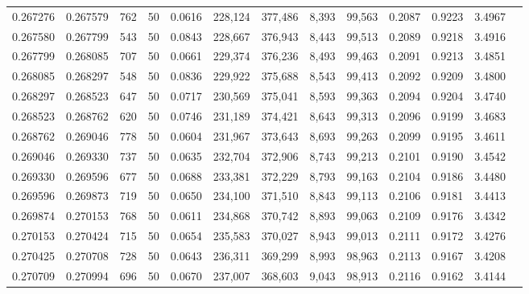 \begin{tabular}{rrrrrrrrrrrrr}
0.267276 & 0.267579 &   762 &  50 &                                     0.0616 & 228,124 & 377,486 &   8,393 &  99,563 & 0.2087 & 0.9223 & 3.4967 \\
0.267580 & 0.267799 &   543 &  50 &                                     0.0843 & 228,667 & 376,943 &   8,443 &  99,513 & 0.2089 & 0.9218 & 3.4916 \\
0.267799 & 0.268085 &   707 &  50 &                                     0.0661 & 229,374 & 376,236 &   8,493 &  99,463 & 0.2091 & 0.9213 & 3.4851 \\
0.268085 & 0.268297 &   548 &  50 &                                     0.0836 & 229,922 & 375,688 &   8,543 &  99,413 & 0.2092 & 0.9209 & 3.4800 \\
0.268297 & 0.268523 &   647 &  50 &                                     0.0717 & 230,569 & 375,041 &   8,593 &  99,363 & 0.2094 & 0.9204 & 3.4740 \\
0.268523 & 0.268762 &   620 &  50 &                                     0.0746 & 231,189 & 374,421 &   8,643 &  99,313 & 0.2096 & 0.9199 & 3.4683 \\
0.268762 & 0.269046 &   778 &  50 &                                     0.0604 & 231,967 & 373,643 &   8,693 &  99,263 & 0.2099 & 0.9195 & 3.4611 \\
0.269046 & 0.269330 &   737 &  50 &                                     0.0635 & 232,704 & 372,906 &   8,743 &  99,213 & 0.2101 & 0.9190 & 3.4542 \\
0.269330 & 0.269596 &   677 &  50 &                                     0.0688 & 233,381 & 372,229 &   8,793 &  99,163 & 0.2104 & 0.9186 & 3.4480 \\
0.269596 & 0.269873 &   719 &  50 &                                     0.0650 & 234,100 & 371,510 &   8,843 &  99,113 & 0.2106 & 0.9181 & 3.4413 \\
0.269874 & 0.270153 &   768 &  50 &                                     0.0611 & 234,868 & 370,742 &   8,893 &  99,063 & 0.2109 & 0.9176 & 3.4342 \\
0.270153 & 0.270424 &   715 &  50 &                                     0.0654 & 235,583 & 370,027 &   8,943 &  99,013 & 0.2111 & 0.9172 & 3.4276 \\
0.270425 & 0.270708 &   728 &  50 &                                     0.0643 & 236,311 & 369,299 &   8,993 &  98,963 & 0.2113 & 0.9167 & 3.4208 \\
0.270709 & 0.270994 &   696 &  50 &                                     0.0670 & 237,007 & 368,603 &   9,043 &  98,913 & 0.2116 & 0.9162 & 3.4144 \\

\end{tabular}
